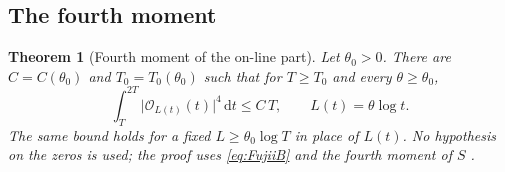 \documentclass[11pt,a4paper]{article}
\numberwithin{equation}{section}
\newtheorem{theorem}{Theorem}[section]
\theoremstyle{definition}
\theoremstyle{remark}
\newcommand{\dd}{\,\mathrm dt}
\begin{document}
\subsection{The fourth moment}\label{sec:taucw-moment}
\begin{theorem}[Fourth moment of the on-line part]\label{thm:taucw-online}
Let $\theta_0>0$. There are $C=C(\theta_0)$ and $T_0=T_0(\theta_0)$ such that for $T\ge T_0$ and every $\theta\ge\theta_0$,
\begin{equation}\label{eq:taucw-L4}
\int_T^{2T}\bigl|\mathcal O_{L(t)}(t)\bigr|^4\dd\le C\,T,\qquad L(t)=\theta\log t.
\end{equation}
The same bound holds for a fixed $L\ge\theta_0\log T$ in place of $L(t)$. No hypothesis on the zeros is used; the proof uses \eqref{eq:FujiiB} and the fourth moment of $S$ \cite{Selberg1946,Titchmarsh}.
\end{theorem}
\end{document}
